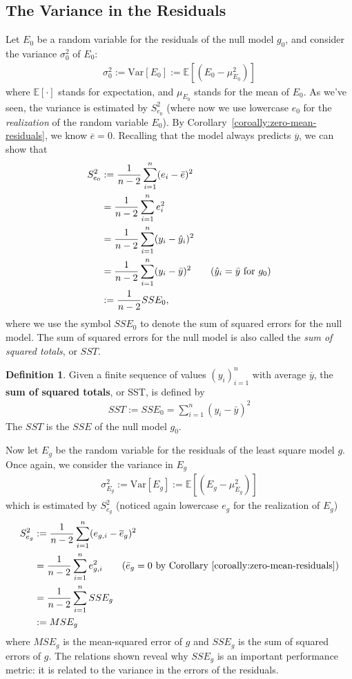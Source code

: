 \documentclass[12pt, a4paper]{article}
\theoremstyle{definition}
\newtheorem*{definition}{Definition}
\begin{document}
	\subsection*{The Variance in the Residuals}
	Let $E_0$ be a random variable for the residuals of the null model $g_0$,
	and consider the variance $\sigma_0^2$ of $E_0$:
	\begin{align*}
		\sigma_{0}^2 := \text{Var}[E_0] := \mathbb{E}[(E_0-\mu_{E_0}^2)]
	\end{align*}
	where $\mathbb{E}[\cdot]$ stands for expectation, and $\mu_{E_0}$ stands for the mean
	of $E_0$. As we've seen, the variance is estimated by $S^2_{e_0}$
	(where now we use lowercase $e_0$ for the \emph{realization} of the
	random variable $E_0$). By Corollary~\ref{coroally:zero-mean-residuals}, we
	know $\overline{e}=0$. Recalling that the model always predicts $\overline{y}$,
	we can show that
	\begin{align*}
		S_{e_0}^2 &:= \frac{1}{n-2}\sum_{i=1}^{n}(e_i-\bar{e})^2\\
		&=\frac{1}{n-2}\sum_{i=1}^{n}e_i^2\\
		&=\frac{1}{n-2}\sum_{i=1}^{n}(y_i-\hat{y}_i)^2\\
		&=\frac{1}{n-2}\sum_{i=1}^{n}(y_i-\bar{y})^2
		\tag{$\hat{y}_i=\bar{y}$ for $g_0$}\\
		&:=\frac{1}{n-2}SSE_0,
	\end{align*}
	where we use the symbol $SSE_0$ to denote the sum of squared errors for the null model.
	The sum of squared errors for the null model is also called the \emph{sum of squared totals},
	or $SST$.
	\begin{tcolorbox}[breakable]
		\begin{definition}
			Given a finite sequence of values $(y_i)_{i=1}^{n}$ with average $\overline{y}$,
			the \textbf{sum of squared totals}, or SST, is defined by
			\begin{align*}
				SST := SSE_0 = \sum_{i=1}^{n}(y_i-\bar{y})^2
			\end{align*}
			The $SST$ is the $SSE$ of the null model $g_0$.
		\end{definition}
	\end{tcolorbox}
	Now let $E_g$ be the random variable for the residuals of the least square model $g$.
	Once again, we consider the variance in $E_g$
	\begin{align*}
		\sigma_{E_g}^2 := \text{Var}[E_g] := \mathbb{E}[(E_g-\mu_{E_g}^2)]
	\end{align*}
	which is estimated by $S_{e_g}^2$ (noticed again lowercase $e_g$ for the realization of $E_g$)
	\begin{align*}
		S_{e_g}^2 &:= \frac{1}{n-2} \sum_{i=1}^{n}(e_{g,i}-\overline{e}_g)^2\\
		&=\frac{1}{n-2}\sum_{i=1}^{n}e_{g,i}^2
		\tag{$\bar{e}_g=0$ by Corollary~\ref{coroally:zero-mean-residuals}}\\
		&=\frac{1}{n-2}\sum_{i=1}^{n}SSE_g\\
		&:=MSE_g
	\end{align*}
	where $MSE_g$ is the mean-squared error of $g$ and $SSE_g$ is the sum of squared errors of $g$.
	The relations shown reveal why $SSE_g$ is an important performance metric: it is related
	to the variance in the errors of the residuals.
\end{document}
